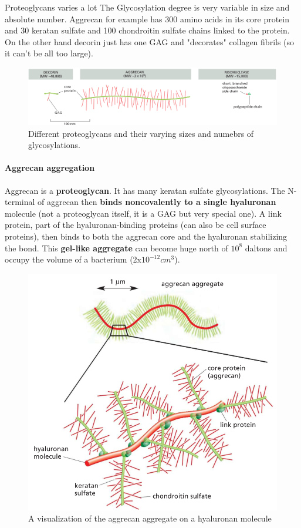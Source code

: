 \documentclass[../main.tex]{subfiles}
\begin{document}
\begin{RemarkWithTitel}{Proteoglycans varies a lot}
	The Glycosylation degree is very variable in size and absolute number. Aggrecan for example has 300 amino acids in its core protein and 30 keratan sulfate and 100 chondroitin sulfate chains linked to the protein. On the other hand decorin just has one GAG and "decorates" collagen fibrils (so it can't be all too large).
	
	\begin{figure}[H]
		\centering
		\includegraphics[width=0.7\linewidth]{gag_ex}
		\caption{Different proteoglycans and their varying sizes and numebrs of glycosylations.}
		\label{fig:gagex}
	\end{figure}
	
\end{RemarkWithTitel}

\paragraph{Aggrecan aggregation}

Aggrecan is a \textbf{proteoglycan}. It has many keratan sulfate glycosylations. The N-terminal of aggrecan then \textbf{binds noncovalently to a single hyaluronan} molecule (not a proteoglycan itself, it is a GAG but very special one). A link protein, part of the hyaluronan-binding proteins (can also be cell surface proteins), then binds to both the aggrecan core and the hyaluronan stabilizing the bond. This \textbf{gel-like aggregate} can become huge north of $10^{8}$ daltons and occupy the volume of a bacterium (2x$10^{-12}cm^{3}$).

\begin{figure}[H]
	\centering
	\includegraphics[width=0.5\linewidth]{agg_comp}
	\caption{A visualization of the aggrecan aggregate on a hyaluronan molecule}
	\label{fig:aggcomp}
\end{figure}
\end{document}
